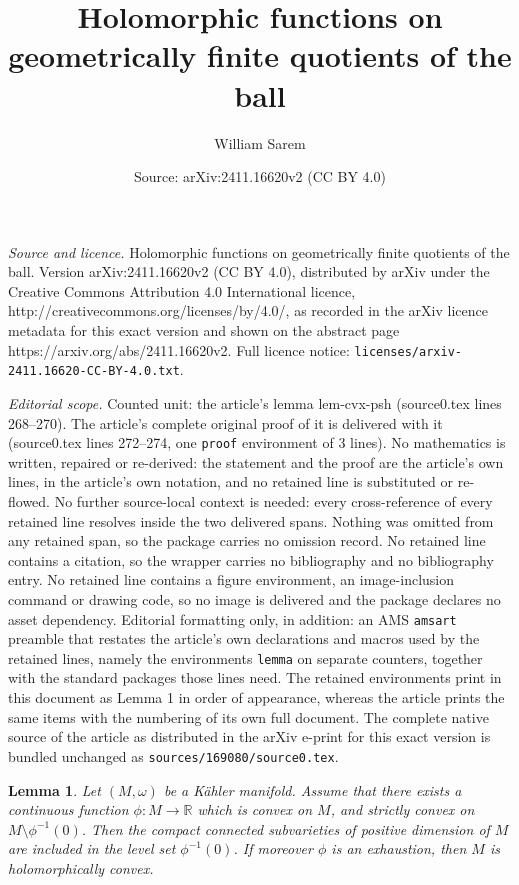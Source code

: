 \documentclass[10pt,a4paper]{amsart}
\title{Holomorphic functions on geometrically finite quotients of the ball}
\author{William Sarem}
\date{Source: arXiv:2411.16620v2 (CC BY 4.0)}
\newtheorem{lemma}{Lemma}
\newcommand{\R}{\mathbb{R}}
\begin{document}
\maketitle

\noindent\emph{Source and licence.} Holomorphic functions on geometrically finite quotients of the ball. Version arXiv:2411.16620v2 (CC BY 4.0), distributed by arXiv under the Creative Commons Attribution 4.0 International licence, http://creativecommons.org/licenses/by/4.0/, as recorded in the arXiv licence metadata for this exact version and shown on the abstract page https://arxiv.org/abs/2411.16620v2. Full licence notice: \texttt{licenses/arxiv-2411.16620-CC-BY-4.0.txt}.\par\smallskip

\noindent\textit{Editorial scope.} Counted unit: the article's lemma lem-cvx-psh (source0.tex lines 268--270). The article's complete original proof of it is delivered with it (source0.tex lines 272--274, one \texttt{proof} environment of 3 lines). No mathematics is written, repaired or re-derived: the statement and the proof are the article's own lines, in the article's own notation, and no retained line is substituted or re-flowed.  No further source-local context is needed: every cross-reference of every retained line resolves inside the two delivered spans.  Nothing was omitted from any retained span, so the package carries no omission record.  No retained line contains a citation, so the wrapper carries no bibliography and no bibliography entry.  No retained line contains a figure environment, an image-inclusion command or drawing code, so no image is delivered and the package declares no asset dependency.  Editorial formatting only, in addition: an AMS \texttt{amsart} preamble that restates the article's own declarations and macros used by the retained lines, namely the environments \texttt{lemma} on separate counters, together with the standard packages those lines need.  The retained environments print in this document as Lemma 1 in order of appearance, whereas the article prints the same items with the numbering of its own full document.  The complete native source of the article as distributed in the arXiv e-print for this exact version is bundled unchanged as \texttt{sources/169080/source0.tex}.
\begin{lemma}\label{lem-cvx-psh}
	Let $(M,\omega)$ be a Kähler manifold. Assume that there exists a continuous function $\phi:M\to \R$ which is convex on $M$, and strictly convex on $M\setminus \phi^{-1}(0)$. Then the compact connected subvarieties of positive dimension of $M$ are included in the level set $\phi^{-1}(0)$. If moreover $\phi$ is an exhaustion, then $M$ is holomorphically convex.
\end{lemma}
\end{document}
